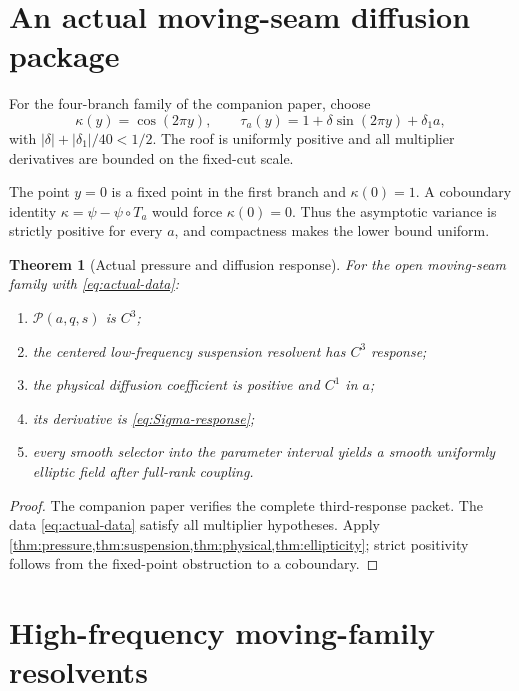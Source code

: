 \documentclass[11pt,reqno]{amsart}
\newtheorem{theorem}{Theorem}[section]
\theoremstyle{definition}
\theoremstyle{remark}
\newcommand{\cP}{\mathscr P}
\newcommand{\abs}[1]{\left\lvert #1\right\rvert}
\begin{document}
\section{An actual moving-seam diffusion package}\label{sec:actual}

For the four-branch family of the companion paper, choose
\begin{equation}\label{eq:actual-data}
 \kappa(y)=\cos(2\pi y),
 \qquad
 \tau_a(y)=1+\delta\sin(2\pi y)+\delta_1a,
\end{equation}
with $\abs\delta+\abs{\delta_1}/40<1/2$.  The roof is uniformly positive and
all multiplier derivatives are bounded on the fixed-cut scale.

The point $y=0$ is a fixed point in the first branch and $\kappa(0)=1$.  A
coboundary identity $\kappa=\psi-\psi\circ T_a$ would force
$\kappa(0)=0$.  Thus the asymptotic variance is strictly positive for every
$a$, and compactness makes the lower bound uniform.

\begin{theorem}[Actual pressure and diffusion response]\label{thm:actual-four}
For the open moving-seam family with \eqref{eq:actual-data}:
\begin{enumerate}[label=\textup{(\roman*)}]
\item $\cP(a,q,s)$ is $C^3$;
\item the centered low-frequency suspension resolvent has $C^3$ response;
\item the physical diffusion coefficient is positive and $C^1$ in $a$;
\item its derivative is \eqref{eq:Sigma-response};
\item every smooth selector into the parameter interval yields a smooth
uniformly elliptic field after full-rank coupling.
\end{enumerate}
\end{theorem}

\begin{proof}
The companion paper verifies the complete third-response packet.  The data
\eqref{eq:actual-data} satisfy all multiplier hypotheses.  Apply
\cref{thm:pressure,thm:suspension,thm:physical,thm:ellipticity}; strict
positivity follows from the fixed-point obstruction to a coboundary.
\end{proof}

\section{High-frequency moving-family resolvents}\label{sec:highfrequency}
\end{document}
